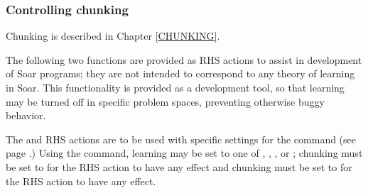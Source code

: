 \subsubsection{Controlling chunking}
\label{SYNTAX-pm-actions-learning}



Chunking is described in Chapter \ref{CHUNKING}.

The following two functions are provided as RHS actions to assist in
development of Soar programs; they are not intended to correspond to any
theory of learning in Soar. This functionality is provided as a development 
tool, so that learning may be turned off in specific problem spaces,
preventing otherwise buggy behavior.

The  and  RHS actions are to be used with
specific settings for the  command (see page \pageref{chunk}.)
Using the  command, learning may be set to one of ,
, , or ; chunking must be set to
 for the  RHS action to have any effect and
chunking must be set to  for the  RHS action
to have any effect.

